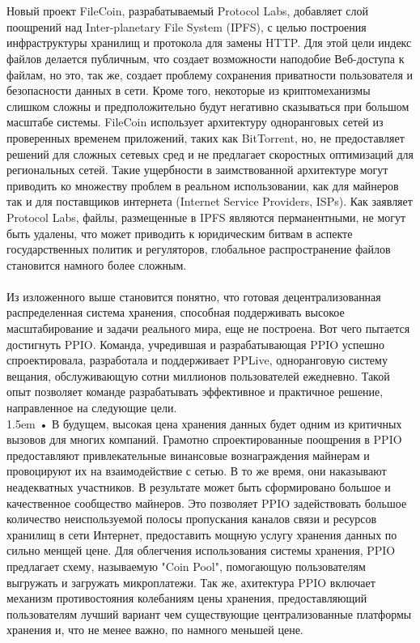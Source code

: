 \documentclass[10pt,a4paper]{article}
\begin{document}
\\ \\Новый проект FileCoin, разрабатываемый Protocol Labs, добавляет слой поощрений над Inter-planetary File System (IPFS), с целью построения инфраструктуры хранилищ и протокола для замены HTTP. Для этой цели индекс файлов делается публичным, что создает возможности наподобие Веб-доступа к файлам, но это, так же, создает проблему сохранения приватности пользователя и безопасности данных в сети. Кроме того, некоторые из криптомеханизмы слишком сложны и предположительно будут негативно сказываться при большом масштабе системы. FileCoin использует архитектуру одноранговых сетей из проверенных временем приложений, таких как BitTorrent, но, не предоставляет решений для сложных сетевых сред и не предлагает скоростных оптимизаций для региональных сетей. Такие ущербности в заимствованной архитектуре могут приводить ко множеству проблем в реальном использовании, как для майнеров так и для поставщиков интернета (Internet Service Providers, ISPs). Как заявляет Protocol Labs, файлы, размещенные в IPFS являются перманентными, не могут быть удалены, что может приводить к юридическим битвам в аспекте государственных политик и регуляторов, глобальное распространение файлов становится намного более сложным.
\vspace{-0.5em}
\\ \\Из изложенного выше становится понятно, что готовая децентрализованная распределенная система хранения, способная поддерживать высокое масштабирование и задачи реального мира, еще не построена. Вот чего пытается достигнуть PPIO. Команда, учредившая и разрабатывающая PPIO успешно спроектировала, разработала и поддерживает PPLive, одноранговую систему вещания, обслуживающую сотни миллионов пользователей ежедневно. Такой опыт позволяет команде разрабатывать эффективное и практичное решение, направленное на следующие цели.
\vspace{-0.6em}
 \\ 
 
\hangindent 1.5em
\noindent   
• В будущем, высокая цена хранения данных будет одним из критичных вызовов для многих компаний. Грамотно спроектированные поощрения в PPIO предоставляют привлекательные винансовые вознаграждения майнерам и провоцируют их на взаимодействие с сетью. В то же время, они наказывают неадекватных участников. В результате может быть сформировано большое и качественное сообщество майнеров. Это позволяет PPIO задействовать большое количество неиспользуемой полосы пропускания каналов связи и ресурсов хранилищ в сети Интернет, предоставить мощную услугу хранения данных по сильно менщей цене. Для облегчения использования системы хранения, PPIO предлагает схему, называемую "Coin Pool", помогающую пользователям выгружать и загружать микроплатежи. Так же, ахитектура PPIO включает механизм противостояния колебаниям цены хранения, предоставляющий пользователям лучший вариант чем существующие централизованные платформы хранения и, что не менее важно, по намного меньшей цене.
\vspace{-0.6em}
\\ \
\end{document}
